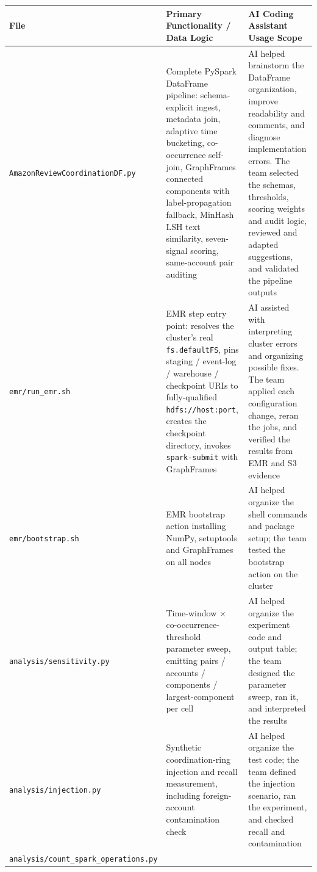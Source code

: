 \documentclass[12pt]{article}
\begin{document}
{\small
\begin{longtable}{@{}p{1.6in}p{2.05in}p{2.05in}@{}}
  \toprule
  \textbf{File} & \textbf{Primary Functionality / Data Logic} &
  \textbf{AI Coding Assistant Usage Scope} \\
  \midrule
  \endhead
  \texttt{AmazonReview\allowbreak CoordinationDF.py} &
    Complete PySpark DataFrame pipeline: schema-explicit ingest, metadata
    join, adaptive time bucketing, co-occurrence self-join, GraphFrames
    connected components with label-propagation fallback, MinHash LSH text
    similarity, seven-signal scoring, same-account pair auditing &
    AI helped brainstorm the DataFrame organization, improve readability and
    comments, and diagnose implementation errors. The team selected the
    schemas, thresholds, scoring weights and audit logic, reviewed and adapted
    suggestions, and validated the pipeline outputs \\
  \addlinespace
  \texttt{emr/run\_emr.sh} &
    EMR step entry point: resolves the cluster's real \texttt{fs.defaultFS},
    pins staging / event-log / warehouse / checkpoint URIs to fully-qualified
    \texttt{hdfs://host:port}, creates the checkpoint directory, invokes
    \texttt{spark-submit} with GraphFrames &
    AI assisted with interpreting cluster errors and organizing possible
    fixes. The team applied each configuration change, reran the jobs, and
    verified the results from EMR and S3 evidence \\
  \addlinespace
  \texttt{emr/bootstrap.sh} &
    EMR bootstrap action installing NumPy, setuptools and GraphFrames on all
    nodes & AI helped organize the shell commands and package setup; the team
    tested the bootstrap action on the cluster \\
  \addlinespace
  \texttt{analysis/}\allowbreak\texttt{sensitivity.py} &
    Time-window $\times$ co-occurrence-threshold parameter sweep, emitting
    pairs / accounts / components / largest-component per cell &
    AI helped organize the experiment code and output table; the team designed
    the parameter sweep, ran it, and interpreted the results \\
  \addlinespace
  \texttt{analysis/}\allowbreak\texttt{injection.py} &
    Synthetic coordination-ring injection and recall measurement, including
    foreign-account contamination check &
    AI helped organize the test code; the team defined the injection scenario,
    ran the experiment, and checked recall and contamination \\
  \addlinespace
  \texttt{analysis/}\allowbreak\texttt{count\_spark\_}\allowbreak\texttt{operations.py} &

\end{longtable}}
\end{document}

